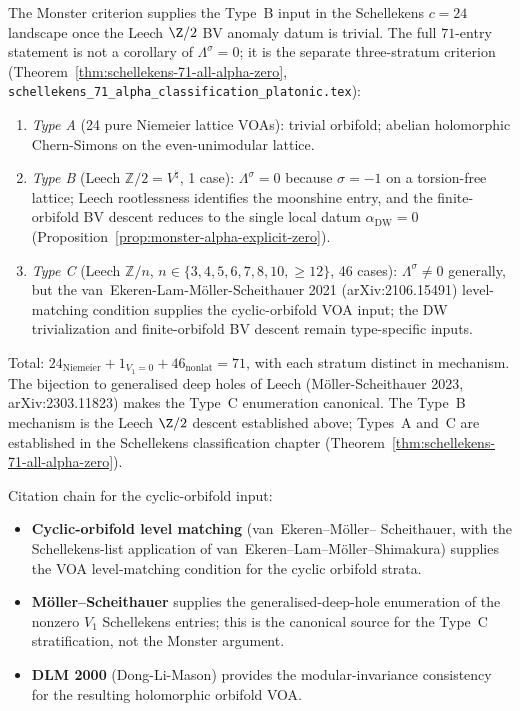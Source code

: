 \begin{remark}
\label{rem:schellekens-71-honest}
The Monster criterion supplies the Type~B input in the Schellekens
$c=24$ landscape once the Leech $\Z/2$ BV anomaly datum is trivial.
The full $71$-entry statement is not a corollary of
$\Lambda^\sigma=0$; it is the separate three-stratum criterion
(Theorem~\ref{thm:schellekens-71-all-alpha-zero},
\texttt{schellekens\_71\_alpha\_classification\_platonic.tex}):

\begin{enumerate}[nosep]
\item \emph{Type A} (24 pure Niemeier lattice VOAs): trivial orbifold;
 abelian holomorphic Chern-Simons on the even-unimodular lattice.
\item \emph{Type B} (Leech $\mathbb{Z}/2 = V^{\natural}$, 1 case):
 $\Lambda^{\sigma} = 0$ because $\sigma=-1$ on a torsion-free
 lattice; Leech rootlessness identifies the moonshine entry, and the
 finite-orbifold BV descent reduces to the single local datum
 $\alpha_{\mathrm{DW}} = 0$ (Proposition~\ref{prop:monster-alpha-explicit-zero}).
\item \emph{Type C} (Leech $\mathbb{Z}/n$, $n \in \{3,4,5,6,7,8,10,\geq 12\}$,
 46 cases): $\Lambda^{\sigma} \ne 0$ generally, but the
 van~Ekeren-Lam-M\"oller-Scheithauer 2021 (arXiv:2106.15491)
 level-matching condition supplies the cyclic-orbifold VOA input;
 the DW trivialization and finite-orbifold BV descent remain
 type-specific inputs.
\end{enumerate}

Total:
$24_{\mathrm{Niemeier}} + 1_{V_1=0} + 46_{\mathrm{nonlat}} = 71$,
with each stratum distinct in mechanism.
The bijection to generalised deep holes of Leech (M\"oller-Scheithauer
2023, arXiv:2303.11823) makes the Type~C enumeration canonical. The
Type~B mechanism is the Leech $\Z/2$ descent established above; Types~A
and~C are established in the Schellekens classification chapter
(Theorem~\ref{thm:schellekens-71-all-alpha-zero}).

Citation chain for the cyclic-orbifold input:
\begin{itemize}[nosep]
\item \textbf{Cyclic-orbifold level matching} (van~Ekeren--M\"oller--
 Scheithauer, with the Schellekens-list application of
 van~Ekeren--Lam--M\"oller--Shimakura) supplies the VOA
 level-matching condition for the cyclic orbifold strata.
\item \textbf{M\"oller--Scheithauer} supplies the generalised-deep-hole
 enumeration of the nonzero $V_1$ Schellekens entries; this is the
 canonical source for the Type~C stratification, not the Monster
 argument.
\item \textbf{DLM 2000} (Dong-Li-Mason) provides the modular-invariance
 consistency for the resulting holomorphic orbifold VOA.
\end{itemize}


\end{remark}
